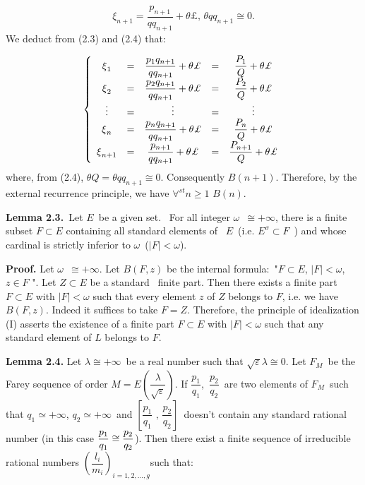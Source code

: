 \documentclass[12pt]{article}
\begin{document}
\begin{equation}
\xi _{n+1}=\dfrac{p_{n+1}}{qq_{n+1}}+\theta \pounds \text{, }\theta
qq_{n+1}\cong 0\text{.}  \tag{2.4}
\end{equation}%
We deduct from (2.3) and (2.4) that:

\begin{equation*}
\left\{ 
\begin{array}{ccccc}
\xi _{1} & = & \dfrac{p_{1}q_{n+1}}{qq_{n+1}}+\theta \pounds  & = & \dfrac{%
P_{1}}{Q}+\theta \pounds  \\ 
\xi _{2} & = & \dfrac{p_{2}q_{n+1}}{qq_{n+1}}+\theta \pounds  & = & \dfrac{%
P_{2}}{Q}+\theta \pounds  \\ 
\vdots & = & \vdots & = & \vdots \\ 
\xi _{n} & = & \dfrac{p_{n}q_{n+1}}{qq_{n+1}}+\theta \pounds  & = & \dfrac{%
P_{n}}{Q}+\theta \pounds  \\ 
\xi _{n+1} & = & \dfrac{p_{n+1}}{qq_{n+1}}+\theta \pounds  & = & \dfrac{%
P_{n+1}}{Q}+\theta \pounds 
\end{array}%
\right.
\end{equation*}%
where, from (2.4), $\theta Q=\theta qq_{n+1}\cong 0$. Consequently $B\left(
n+1\right) $. Therefore, by the external recurrence principle, we have $%
\forall ^{st}n\geq 1$ $B\left( n\right) $.\newline

\noindent \textbf{Lemma 2.3.}\textit{\ }Let $E$\ be a given set. \ For all
integer $\omega $\ $\cong +\infty $, there is a finite subset $F\subset E$
containing all standard elements of \ $E$\ (i.e. $E^{\sigma }\subset F$\ )
and whose cardinal is strictly inferior to $\omega $\ ($\left\vert
F\right\vert <\omega $).\newline

\noindent \textbf{Proof.} Let $\omega $\textit{\ }$\cong +\infty $. Let $%
B\left( F,z\right) $ be the internal formula:\ "$F\subset E$, $\left\vert
F\right\vert <\omega $, $z\in F$ ". Let $Z\subset E$ be a standard \ finite
part. Then there exists a finite part $F\subset E$ with $\left\vert
F\right\vert <\omega $ such that every element $z$ of $Z$ belongs to $F$,
i.e. we have $B\left( F,z\right) $. Indeed it suffices to take $F=Z$.
Therefore, the principle of idealization (I) asserts the existence of a
finite part $F\subset E$ with $\left\vert F\right\vert <\omega $ such that
any standard element of $L$ belongs to $F$.\newline

\noindent \textbf{Lemma 2.4. }Let $\lambda \cong +\infty $\ be a real number
such that $\sqrt{\varepsilon }\lambda \cong 0$. Let $F_{M}$\ be the Farey
sequence of order $M=E\left( \dfrac{\lambda }{\sqrt{\varepsilon }}\right) $.
If $\dfrac{p_{1}}{q_{1}}$,\ $\dfrac{p_{2}}{q_{2}}$\ are two elements of $%
F_{M}$\ such that $q_{1}\simeq +\infty $, $q_{2}\simeq +\infty $\ and $\left[
\dfrac{p_{1}}{q_{1}}\text{ , }\dfrac{p_{2}}{q_{2}}\right] $\ doesn't contain
any standard rational number (in this case $\dfrac{p_{1}}{q_{1}}\cong \dfrac{%
p_{2}}{q_{2}}$). Then there exist a finite sequence of irreducible rational
numbers $\left( \dfrac{l_{i}}{m_{i}}\right) _{i=1,2,...,g}$such that:
\end{document}
